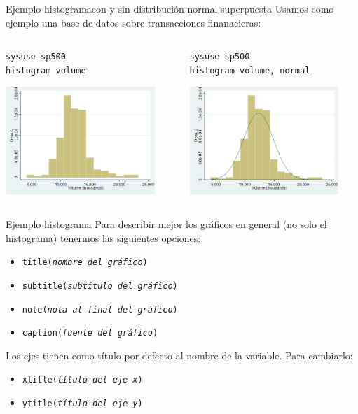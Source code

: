 \documentclass{beamer}
\begin{document}
\begin{frame}{Ejemplo histograma}{con y sin distribución normal superpuesta}
{\footnotesize Usamos como ejemplo una base de datos sobre transacciones finanacieras:}\medskip
\begin{columns}
\begin{column}{5cm}
{\footnotesize 
\texttt{sysuse sp500}\\
\texttt{histogram volume}}\\\medskip
\centerline{\includegraphics[height=4.1cm]{Graph.png}}
\end{column}
\begin{column}{5cm}
{\footnotesize 
\texttt{sysuse sp500}\\
\texttt{histogram volume, normal}}\\\medskip
\centerline{\includegraphics[height=4.1cm]{Graph1.png}}
\end{column}
\end{columns}
\end{frame}

 
\begin{frame}{Ejemplo histograma}{}
Para describir mejor los gráficos en general (no solo el histograma) tenermos las siguientes opciones:
\begin{itemize}
\item \texttt{title(\textit{nombre del gráfico})}
\item \texttt{subtitle(\textit{subtítulo del gráfico})}
\item \texttt{note(\textit{nota al final del gráfico})}
\item \texttt{caption(\textit{fuente del gráfico})}
\end{itemize}
Los ejes tienen como título por defecto al nombre de la variable. Para cambiarlo:
\begin{itemize}
\item \texttt{xtitle(\textit{título del eje x})}
\item \texttt{ytitle(\textit{título del eje y})}
\end{itemize}
\end{frame}
\end{document}
